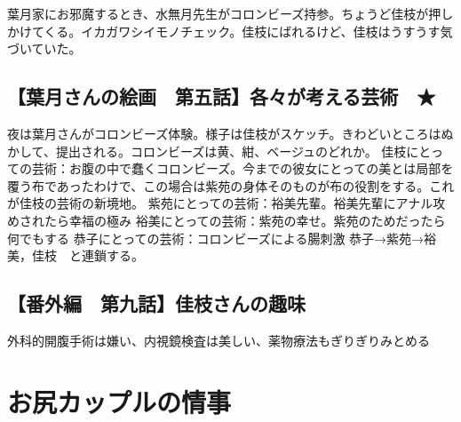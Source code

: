 葉月家にお邪魔するとき、水無月先生がコロンビーズ持参。ちょうど佳枝が押しかけてくる。イカガワシイモノチェック。佳枝にばれるけど、佳枝はうすうす気づいていた。

\section{【葉月さんの絵画　第五話】各々が考える芸術　★}
夜は葉月さんがコロンビーズ体験。様子は佳枝がスケッチ。きわどいところはぬかして、提出される。コロンビーズは黄、紺、ベージュのどれか。
佳枝にとっての芸術：お腹の中で蠢くコロンビーズ。今までの彼女にとっての美とは局部を覆う布であったわけで、この場合は紫苑の身体そのものが布の役割をする。これが佳枝の芸術の新境地。
紫苑にとっての芸術：裕美先輩。裕美先輩にアナル攻めされたら幸福の極み
裕美にとっての芸術：紫苑の幸せ。紫苑のためだったら何でもする
恭子にとっての芸術：コロンビーズによる腸刺激
恭子→紫苑→裕美，佳枝　と連鎖する。









\section{【番外編　第九話】佳枝さんの趣味}
外科的開腹手術は嫌い、内視鏡検査は美しい、薬物療法もぎりぎりみとめる


\chapter{お尻カップルの情事}

